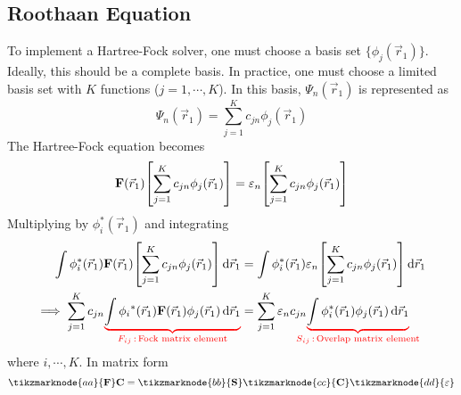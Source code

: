\documentclass[12pt,a4paper,titlepage]{article}
\newcommand{\trm}[1]{\textrm{#1}} %
\begin{document}
\subsection{Roothaan Equation}
To implement a Hartree-Fock solver, one must choose a basis set $\{\phi_{j}(\vec{r}_{1})\}$. Ideally, this should be a complete basis. In practice, one must choose a limited basis set with $K$ functions ($j=1,\cdots,K$). In this basis, $\Psi_{n}(\vec{r}_{1})$ is represented as
\begin{equation}
\Psi_{n}(\vec{r}_{1})=\sum_{j=1}^{K}c_{jn}\phi_{j}(\vec{r}_{1})
\end{equation}
The Hartree-Fock equation becomes
\begin{equation}
\vb{F}(\vec{r}_{1})\qty[\sum_{j=1}^{K}c_{jn}\phi_{j}(\vec{r}_{1})]=\varepsilon_{n}\qty[\sum_{j=1}^{K}c_{jn}\phi_{j}(\vec{r}_{1})]
\end{equation}
Multiplying by $\phi_{i}^{*}(\vec{r}_{1})$ and integrating
\begin{equation}
\begin{aligned}
\int\phi_{i}^{*}(\vec{r}_{1})\vb{F}(\vec{r}_{1})\qty[\sum_{j=1}^{K}c_{jn}\phi_{j}(\vec{r}_{1})]\dd{\vec{r}_{1}}&=\int\phi_{i}^{*}(\vec{r}_{1})\varepsilon_{n}\qty[\sum_{j=1}^{K}c_{jn}\phi_{j}(\vec{r}_{1})]\dd{\vec{r}_{1}}\\
\implies\sum_{j=1}^{K}c_{jn}{\color{red}\underbrace{\color{black}\int\phi_i{}^{*}(\vec{r}_{1})\vb{F}(\vec{r}_{1})\phi_{j}(\vec{r}_{1})\dd{\vec{r}_{1}}}_{F_{ij}\,:\,\trm{Fock matrix element}}}&=\sum_{j=1}^{K}\varepsilon_{n}c_{jn}{\color{red}\underbrace{\color{black}\int\phi_{i}^{*}(\vec{r}_{1})\phi_{j}(\vec{r}_{1})\dd{\vec{r}_{1}}}_{\mathclap{S_{ij}\,:\,\trm{Overlap matrix element}}}}
\end{aligned}
\end{equation}
where $i,\cdots,K$. In matrix form
\begin{equation}
\tikzmarknode{aa}{\vb{F}}\vb{C}=\tikzmarknode{bb}{\vb{S}}\tikzmarknode{cc}{\vb{C}}\tikzmarknode{dd}{\vb{\varepsilon}}
\end{equation}
\end{document}
